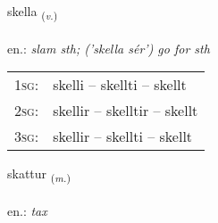 \documentclass[frontgrid, backgrid]{flacards}\usepackage[]{graphicx}\usepackage[]{xcolor}
\begin{document}
\renewcommand{\flhead}{\vskip5pt \fboxsep=0pt {\small\bfseries\footnotesize Sagnorð | Verb}}
\renewcommand{\fcfoot}{\vskip5pt \fboxsep=0pt \hspace{2pt}{\small\bfseries\footnotesize 2K}}

\renewcommand{\blhead}{\vskip5pt {\small\bfseries\footnotesize Sagnorð | Verb }}
\renewcommand{\bcfoot}{\vskip5pt \hspace{2pt}{\small\bfseries\footnotesize 2K}}


{skella \small{\textsubscript{(\textit{v.})}} \\[1ex] %
\textphonetic{[scɛtla]} \\
en.: \emph{slam sth; ('skella sér') go for sth} \\  [2ex]
\renewcommand*{\arraystretch}{0.8}
\begin{tabular}{p{1cm}l}
\textsc{1sg}: & skelli -- skellti -- skellt \\ 
\textsc{2sg}: & skellir -- skelltir -- skellt \\ 
\textsc{3sg}: & skellir -- skellti -- skellt \\ 
\end{tabular}
}

\renewcommand{\flhead}{\vskip5pt \fboxsep=0pt {\small\bfseries\footnotesize Nafnorð | Noun}}
\renewcommand{\fcfoot}{\vskip5pt \fboxsep=0pt \hspace{2pt}{\small\bfseries\footnotesize 2K}}

\renewcommand{\blhead}{\vskip5pt {\small\bfseries\footnotesize Nafnorð | Noun }}
\renewcommand{\bcfoot}{\vskip5pt \hspace{2pt}{\small\bfseries\footnotesize 2K}}


{skattur \small{\textsubscript{(\textit{m.})}} \\[1ex] %
\textphonetic{[skahtʏr]} \\
en.: \emph{tax} \\  [2ex]
\renewcommand*{\arraystretch}{0.8}
}
\end{document}
